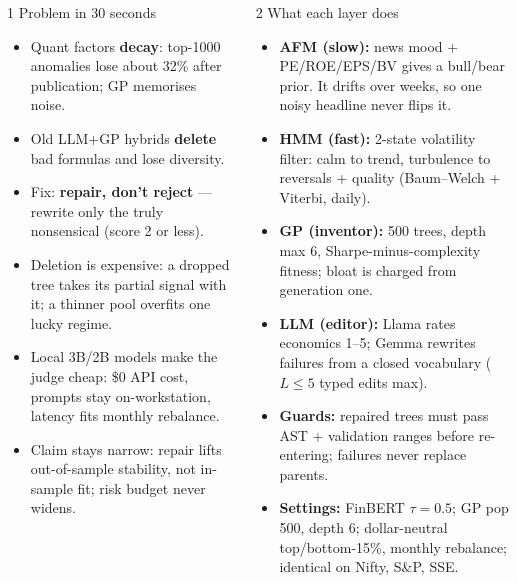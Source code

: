 \documentclass[final]{beamer}
\newcommand{\hl}[1]{\textbf{\textcolor{navy2}{#1}}}
\begin{document}
\begin{frame}[t]
\begin{columns}[t,onlytextwidth]
\begin{block}{1 Problem in 30 seconds}
\begin{itemize}
  \item Quant factors \hl{decay}: top-1000 anomalies lose about 32\% after publication; GP memorises noise.
  \item Old LLM+GP hybrids \hl{delete} bad formulas and lose diversity.
  \item Fix: \hl{repair, don't reject} --- rewrite only the truly nonsensical (score 2 or less).
  \item Deletion is expensive: a dropped tree takes its partial signal with it; a thinner pool overfits one lucky regime.
  \item Local 3B/2B models make the judge cheap: \$0 API cost, prompts stay on-workstation, latency fits monthly rebalance.
  \item Claim stays narrow: repair lifts out-of-sample stability, not in-sample fit; risk budget never widens.
\end{itemize}
\end{block}
\begin{block}{2 What each layer does}
\begin{itemize}
  \item \hl{AFM (slow):} news mood + PE/ROE/EPS/BV gives a bull/bear prior. It drifts over weeks, so one noisy headline never flips it.
  \item \hl{HMM (fast):} 2-state volatility filter: calm to trend, turbulence to reversals + quality (Baum--Welch + Viterbi, daily).
  \item \hl{GP (inventor):} 500 trees, depth max 6, Sharpe-minus-complexity fitness; bloat is charged from generation one.
  \item \hl{LLM (editor):} Llama rates economics 1--5; Gemma rewrites failures from a closed vocabulary ($L\le5$ typed edits max).
  \item \hl{Guards:} repaired trees must pass AST + validation ranges before re-entering; failures never replace parents.
  \item \hl{Settings:} FinBERT $\tau=0.5$; GP pop 500, depth 6; dollar-neutral top/bottom-15\%, monthly rebalance; identical on Nifty, S\&P, SSE.
\end{itemize}
\end{block}


\end{columns}
\end{frame}
\end{document}
